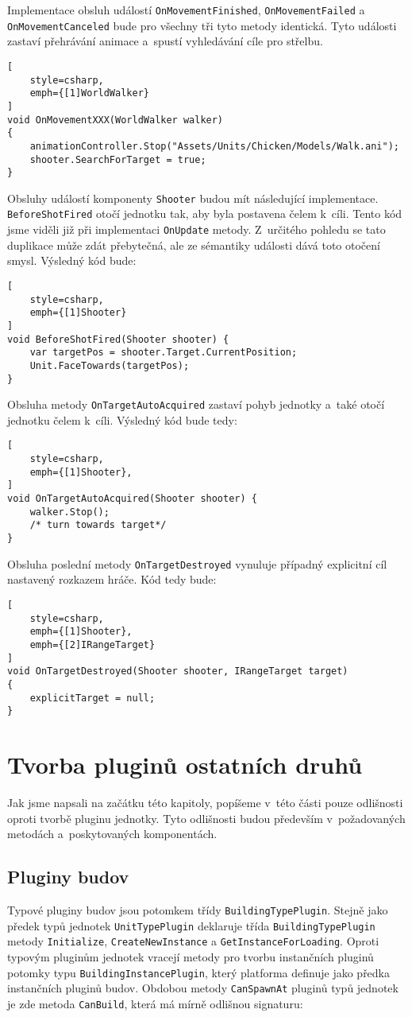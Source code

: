 Implementace obsluh událostí \texttt{OnMovementFinished}, \texttt{OnMovementFailed} a \texttt{OnMovementCanceled} bude pro všechny tři tyto metody identická. Tyto události zastaví přehrávání animace a~spustí vyhledávání cíle pro střelbu.
\begin{lstlisting}[
	style=csharp,
	emph={[1]WorldWalker}
]
void OnMovementXXX(WorldWalker walker)
{
	animationController.Stop("Assets/Units/Chicken/Models/Walk.ani");
	shooter.SearchForTarget = true;
}
\end{lstlisting}

Obsluhy událostí komponenty \texttt{Shooter} budou mít následující implementace. \texttt{BeforeShotFired} otočí jednotku tak, aby byla postavena čelem k~cíli. Tento kód jsme viděli již při implementaci \texttt{OnUpdate} metody. Z~určitého pohledu se tato duplikace může zdát přebytečná, ale ze sémantiky události dává toto otočení smysl. Výsledný kód bude:
\begin{lstlisting}[
	style=csharp,
	emph={[1]Shooter}
]
void BeforeShotFired(Shooter shooter) {
	var targetPos = shooter.Target.CurrentPosition;
	Unit.FaceTowards(targetPos);
}
\end{lstlisting}

Obsluha metody \texttt{OnTargetAutoAcquired} zastaví pohyb jednotky a~také otočí jednotku čelem k~cíli. Výsledný kód bude tedy:
\begin{lstlisting}[
	style=csharp,
	emph={[1]Shooter},
]
void OnTargetAutoAcquired(Shooter shooter) {
	walker.Stop();
	/* turn towards target*/
}
\end{lstlisting}

Obsluha poslední metody \texttt{OnTargetDestroyed} vynuluje případný explicitní cíl nastavený rozkazem hráče. Kód tedy bude:
\begin{lstlisting}[
	style=csharp,
	emph={[1]Shooter},
	emph={[2]IRangeTarget}
]
void OnTargetDestroyed(Shooter shooter, IRangeTarget target)
{
	explicitTarget = null;	
}
\end{lstlisting}

\section{Tvorba pluginů ostatních druhů}
Jak jsme napsali na začátku této kapitoly, popíšeme v~této části pouze odlišnosti oproti tvorbě pluginu jednotky. Tyto odlišnosti budou především v~požadovaných metodách a~poskytovaných komponentách.  

\subsection{Pluginy budov}
Typové pluginy budov jsou potomkem třídy \texttt{BuildingTypePlugin}.
Stejně jako předek typů jednotek \texttt{UnitTypePlugin} deklaruje třída \texttt{BuildingTypePlugin} metody \texttt{Initialize}, \texttt{CreateNewInstance} a \texttt{GetInstanceForLoading}. Oproti typovým pluginům jednotek vracejí metody pro tvorbu instančních pluginů potomky typu \texttt{BuildingInstancePlugin}, který platforma definuje jako předka instančních pluginů budov. Obdobou metody \texttt{CanSpawnAt} pluginů typů jednotek je zde metoda \texttt{CanBuild}, která má mírně odlišnou signaturu:

